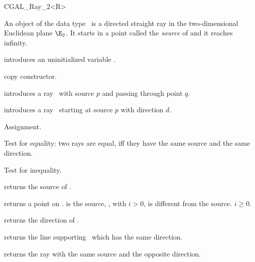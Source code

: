 
\begin{ccClassTemplate} {CGAL_Ray_2<R>}

\ccDefinition
An object  of the data type \ccClassName\ is a directed
straight ray in the two-dimensional Euclidean plane $\E_2$. It starts
in a  point called the {\em source} of   and it reaches infinity.

\ccCreation
{}


\ccHidden {}
             {introduces an uninitialized variable \ccVar.}

\ccHidden {}
 	    {copy constructor.}

            {introduces a ray \ccVar\ 
             with source $p$ and passing through point $q$.}

            {introduces a ray \ccVar\ starting at source $p$ with 
             direction $d$.}

\ccOperations
\ccSetTwoOfThreeColumns{5cm}{4cm}

\ccHidden {}
        {Assignment.}

       {Test for equality: two rays are equal, iff they have the same 
        source and the same direction.}

       {Test for inequality.}



       {returns the source of \ccVar.}


       {returns a point on \ccVar.  is the source,
        \ccStyle{point(i)}, with $i>0$, is different from the 
        source. \ccPrecond $i \geq 0$.}

       {returns the direction of \ccVar.}

       {returns the line supporting \ccVar\ which has the same direction.}

       {returns the ray with the same source and the opposite direction.}


\end{ccClassTemplate}
